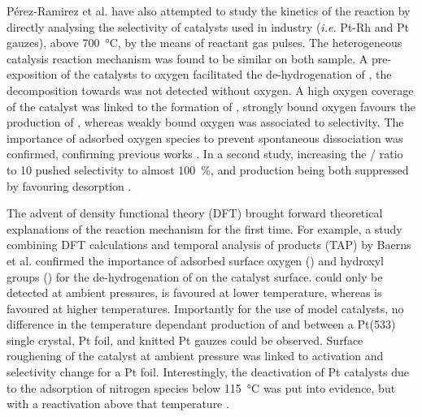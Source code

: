 Pérez-Ramirez et al. \parencite*{PerezRamirez2004} have also attempted to study the kinetics of the reaction by directly analysing the selectivity of catalysts used in industry (\textit{i.e.} Pt-Rh and Pt gauzes), above \qty{700}{\degreeCelsius}, by the means of reactant gas pulses.
The heterogeneous catalysis reaction mechanism was found to be similar on both sample.
A pre-exposition of the catalysts to oxygen facilitated the de-hydrogenation of , the decomposition towards  was not detected without oxygen.
A high oxygen coverage of the catalyst was linked to the formation of , strongly bound oxygen favours the production of , whereas weakly bound oxygen was associated to  selectivity.
The importance of adsorbed oxygen species to prevent spontaneous  dissociation was confirmed, confirming previous works \parencite{Bradley1995}.
In a second study, increasing the / ratio to 10 pushed  selectivity to almost \qty{100}{\percent},  and  production being both suppressed by favouring  desorption \parencite{PerezRamirez2009}.

The advent of density functional theory (DFT) brought forward theoretical explanations of the reaction mechanism for the first time.
For example, a study combining DFT calculations and temporal analysis of products (TAP) by Baerns et al. \parencite*{Baerns2005} confirmed the importance of adsorbed surface oxygen () and hydroxyl groups () for the de-hydrogenation of  on the catalyst surface.
 could only be detected at ambient pressures,  is favoured at lower temperature, whereas  is favoured at higher temperatures.
Importantly for the use of model catalysts, no difference in the temperature dependant production of  and  between a Pt(533) single crystal, Pt foil, and knitted Pt gauzes could be observed.
Surface roughening of the catalyst at ambient pressure was linked to activation and selectivity change for a Pt foil.
Interestingly, the deactivation of Pt catalysts due to the adsorption of nitrogen species below \qty{115}{\degreeCelsius} was put into evidence, but with a reactivation above that temperature \parencite{Sobczyk2004}.


